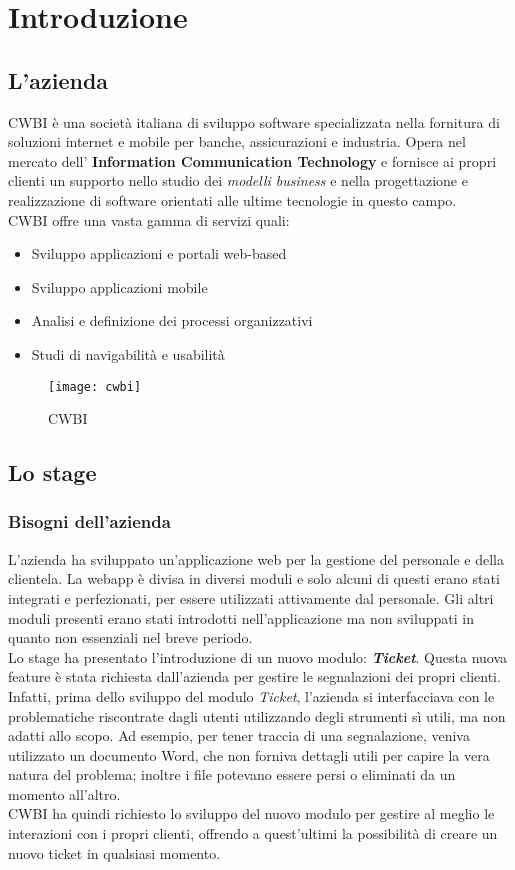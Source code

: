 \chapter{Introduzione}
\label{cap:introduzione}

\section{L'azienda}

CWBI è una società italiana di sviluppo software specializzata nella fornitura di soluzioni internet e mobile per banche, assicurazioni e industria. Opera nel mercato dell' \textbf{Information Communication Technology} e fornisce ai propri clienti un supporto nello studio dei \textit{modelli business} e nella progettazione e realizzazione di software orientati alle ultime tecnologie in questo campo.\\
CWBI offre una vasta gamma di servizi quali:
\begin{itemize}
\item Sviluppo applicazioni e portali web-based
\item Sviluppo applicazioni mobile
\item Analisi e definizione dei processi organizzativi
\item Studi di navigabilità e usabilità
\end{itemize}  
\begin{figure}[!h]
     \centering
     \texttt{[image: cwbi]}
     \caption{CWBI}
\end{figure}

\section{Lo stage}
\subsection{Bisogni dell'azienda}
L'azienda ha sviluppato un'applicazione web per la gestione del personale e della clientela. La webapp è divisa in diversi moduli e solo alcuni di questi erano stati integrati e perfezionati, per essere utilizzati attivamente dal personale. Gli altri moduli presenti erano stati introdotti nell'applicazione ma non sviluppati in quanto non essenziali nel breve periodo. \\
Lo stage ha presentato l'introduzione di un nuovo modulo: \textbf{\textit{Ticket}}. Questa nuova feature è stata richiesta dall'azienda per gestire le segnalazioni dei propri clienti. Infatti, prima dello sviluppo del modulo \textit{Ticket}, l'azienda si interfacciava con le problematiche riscontrate dagli utenti utilizzando degli strumenti sì utili, ma non adatti allo scopo. Ad esempio, per tener traccia di una segnalazione, veniva utilizzato un documento Word, che non forniva dettagli utili per capire la vera natura del problema; inoltre i file potevano essere persi o eliminati da un momento all'altro. \\
CWBI ha quindi richiesto lo sviluppo del nuovo modulo per gestire al meglio le interazioni con i propri clienti, offrendo a quest'ultimi la possibilità di creare un nuovo ticket in qualsiasi momento.
